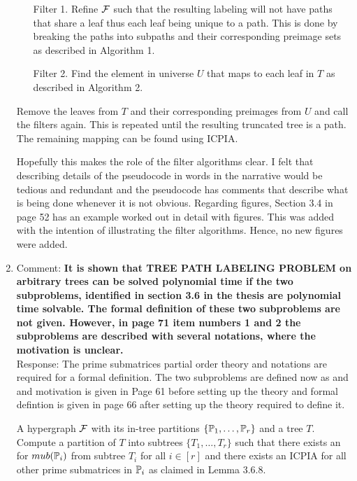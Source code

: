 \documentclass[12pt,a4paper]{article}
\begin{document}
\begin{enumerate}
{\em \begin{enumerate}
\item [Filter 1.] \filteri Refine ${\cal F}$ such that the resulting
  labeling will not have paths that share a leaf thus each leaf being
  unique to a path. This is done by breaking the paths into subpaths and their
  corresponding preimage sets as described in Algorithm 1.
\item [Filter 2.] \filterii Find the element in universe $U$ that maps to each
  leaf in $T$ as described in Algorithm 2. 
\end{enumerate}
Remove the leaves from $T$ and their corresponding preimages from $U$
and call the filters again. This is repeated until the resulting
truncated tree is a path. The remaining mapping can be found using
ICPIA.
}

Hopefully this makes the role of the filter algorithms clear.
I felt that describing details of the pseudocode in words in the narrative would
be tedious and redundant and the pseudocode has comments that describe what is being
done whenever it is not obvious. Regarding figures, Section 3.4 in
page 52 has an example worked out in detail with figures. This was
added with the intention of illustrating the filter algorithms. Hence,
no new figures were added.


\item Comment: {\bf It is shown that TREE PATH LABELING PROBLEM on
    arbitrary trees can be solved polynomial time if the two
    subproblems, identified in section 3.6 in the thesis are
    polynomial time solvable. The formal definition of these two
    subproblems are not given. However, in page 71 item numbers 1 and
    2 the subproblems are described with several notations, where the
    motivation is unclear.}\\
Response: The prime submatrices partial order theory and notations are
required for a formal definition.
The two subproblems are defined now as \FOCPS and \FMFT and motivation is
given in Page 61 before setting up the theory and formal defintion is
given in page 66 after setting up the theory required to define it.

{\em

\begin{problemdef}{\FOCPS}{A hypergraph ${\cal F}$ with its in-tree
    partitions $\{\mathbb P_1,\ldots,\mathbb P_r\}$ and
    a tree $T$.}
  Compute a partition of $T$ into subtrees $\{T_1, \ldots, T_r\}$ such
  that there exists an \ICPPL for $mub(\mathbb P_i)$ from subtree
  $T_i$ for all $i \in [r]$ and there exists an ICPIA for all other
  prime submatrices in $\mathbb P_i$ as claimed in Lemma 3.6.8.
\end{problemdef}

}
\end{enumerate}
\end{document}
